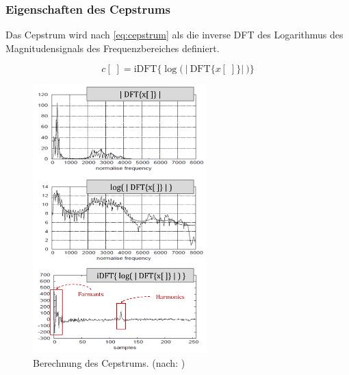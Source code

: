 \subsubsection{Eigenschaften des Cepstrums}
\label{sec:vad_ceps_features}

Das Cepstrum wird nach \autoref{eq:cepstrum} als die inverse DFT des Logarithmus des Magnitudensignals des Frequenzbereiches definiert.\cite[\emph{Cepstral Analysis}]{ricardo_ceps}

\begin{equation}
c[\;] =  \text{iDFT}\Big\{ \log \Big(\ \big|\ \text{DFT}\{x[\;]\} \big|\ \Big) \Big\}
\label{eq:cepstrum}
\end{equation}	

\begin{figure}[H]
	\centering
	\includegraphics[width=0.6\textwidth]{bilder/cepstrum04.png}
	\caption[Berechnung des Cepstrums]{Berechnung des Cepstrums. (nach: \cite[\emph{Cepstral Analysis}, S. 3]{ricardo_ceps})}
	\label{img:cepstrumOverview}
\end{figure}

